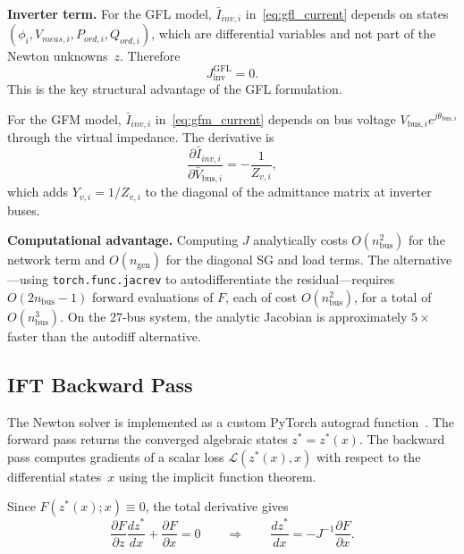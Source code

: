 \documentclass[11pt]{article}
\begin{document}
\textbf{Inverter term.}  For the GFL model,
$\bar{I}_{inv,i}$ in~\eqref{eq:gfl_current} depends on states
$(\phi_i, V_{meas,i}, P_{ord,i}, Q_{ord,i})$, which are
differential variables and not part of the Newton unknowns~$z$.
Therefore
\begin{equation}
  J_{\mathrm{inv}}^{\mathrm{GFL}} = 0.
  \label{eq:jinv_gfl}
\end{equation}
This is the key structural advantage of the GFL formulation.

For the GFM model, $\bar{I}_{inv,i}$
in~\eqref{eq:gfm_current} depends on bus voltage
$V_{\mathrm{bus},i} e^{j\theta_{\mathrm{bus},i}}$ through the
virtual impedance.  The derivative is
\begin{equation}
  \frac{\partial \bar{I}_{inv,i}}{\partial \bar{V}_{\mathrm{bus},i}}
    = -\frac{1}{Z_{v,i}},
  \label{eq:jinv_gfm}
\end{equation}
which adds $Y_{v,i} = 1/Z_{v,i}$ to the diagonal of the admittance
matrix at inverter buses.

\textbf{Computational advantage.}  Computing $J$ analytically costs
$O(n_{\mathrm{bus}}^2)$ for the network term and $O(n_{\mathrm{gen}})$
for the diagonal SG and load terms.  The alternative---using
\texttt{torch.func.jacrev} to autodifferentiate the
residual---requires $O(2n_{\mathrm{bus}}-1)$ forward evaluations of
$F$, each of cost $O(n_{\mathrm{bus}}^2)$, for a total of
$O(n_{\mathrm{bus}}^3)$.  On the 27-bus system, the analytic Jacobian
is approximately $5\times$ faster than the autodiff alternative.


\subsection{IFT Backward Pass}
\label{sec:ift}

The Newton solver is implemented as a custom PyTorch autograd
function~\cite{Paszke19PyTorch}.  The forward pass returns the
converged algebraic states $z^* = z^*(x)$.  The backward pass
computes gradients of a scalar loss
$\mathcal{L}(z^*(x), x)$ with respect to the differential
states~$x$ using the implicit function theorem.

Since $F(z^*(x); x) \equiv 0$, the total derivative gives
\begin{equation}
  \frac{\partial F}{\partial z}\frac{dz^*}{dx}
    + \frac{\partial F}{\partial x} = 0
  \qquad \Longrightarrow \qquad
  \frac{dz^*}{dx} = -J^{-1}\frac{\partial F}{\partial x}.
  \label{eq:ift}
\end{equation}
\end{document}
